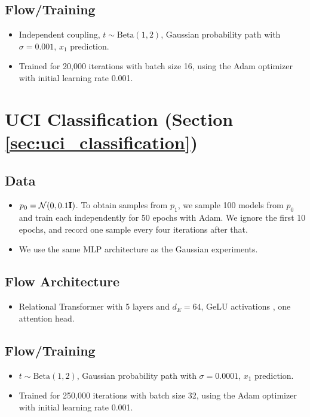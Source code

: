 \subsection*{Flow/Training}
\begin{itemize}
    \item Independent coupling, $t \sim \text{Beta}(1, 2)$, Gaussian probability path with $\sigma = 0.001$, $x_1$ prediction.
    \item Trained for 20,000 iterations with batch size 16, using the Adam optimizer with initial learning rate 0.001.
\end{itemize}

\section*{UCI Classification (Section \ref{sec:uci_classification})}

\subsection*{Data}

\begin{itemize}
    \item $p_0 = \mathcal{N}(0, 0.1 \mathbf{I})$. To obtain samples from $p_1$, we sample 100 models from $p_0$ and train each independently for 50 epochs with Adam. We ignore the first 10 epochs, and record one sample every four iterations after that. 
    \item We use the same MLP architecture as the Gaussian experiments. 
\end{itemize}

\subsection*{Flow Architecture}
\begin{itemize}
    \item Relational Transformer \citep{diaoRelationalAttentionGeneralizing2023,kofinasGraphNeuralNetworks2024} with 5 layers and $d_E = 64$, GeLU activations \citep{hendrycksGaussianErrorLinear2023a}, one attention head. 
\end{itemize}

\subsection*{Flow/Training}
\begin{itemize}
    \item $t \sim \text{Beta}(1, 2)$, Gaussian probability path with $\sigma = 0.0001$, $x_1$ prediction.
    \item Trained for 250,000 iterations with batch size 32, using the Adam optimizer with initial learning rate 0.001.
\end{itemize}


